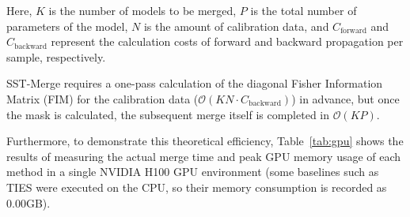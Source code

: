 \documentclass{article}
\begin{document}
Here, $K$ is the number of models to be merged, $P$ is the total number of parameters of the model, $N$ is the amount of calibration data, and $C_{\text{forward}}$ and $C_{\text{backward}}$ represent the calculation costs of forward and backward propagation per sample, respectively.

SST-Merge requires a one-pass calculation of the diagonal Fisher Information Matrix (FIM) for the calibration data ($\mathcal{O}(KN \cdot C_{\text{backward}})$) in advance, but once the mask is calculated, the subsequent merge itself is completed in $\mathcal{O}(KP)$.


Furthermore, to demonstrate this theoretical efficiency, Table~\ref{tab:gpu} shows the results of measuring the actual merge time and peak GPU memory usage of each method in a single NVIDIA H100 GPU environment (some baselines such as TIES were executed on the CPU, so their memory consumption is recorded as 0.00GB).

\begin{table}[H]
\centering
\caption{各merge手法の実測merge時間とピークGPUメモリ(平均)}
\label{tab:gpu}
\small
{}
\end{table}
\end{document}
